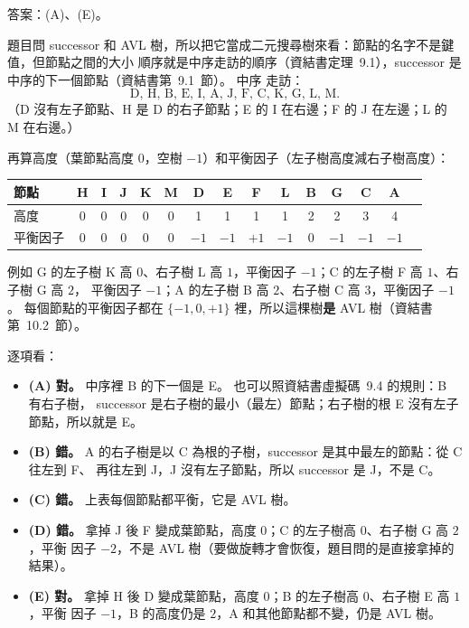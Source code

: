 \begin{pastsoln}
答案：(A)、(E)。

題目問 successor 和 AVL 樹，所以把它當成二元搜尋樹來看：節點的名字不是鍵值，但節點之間的大小
順序就是中序走訪的順序（資結書定理~9.1），successor 是中序的下一個節點（資結書第~9.1~節）。 中序
走訪：
\[
\text{D, H, B, E, I, A, J, F, C, K, G, L, M}.
\]
（D 沒有左子節點、H 是 D 的右子節點；E 的 I 在右邊；F 的 J 在左邊；L 的 M 在右邊。）

再算高度（葉節點高度 $0$，空樹 $-1$）和平衡因子（左子樹高度減右子樹高度）：
\begin{center}
\small
\begin{tabular}{lcccccccccccccc}
\toprule
節點 & H & I & J & K & M & D & E & F & L & B & G & C & A \\
\midrule
高度 & 0 & 0 & 0 & 0 & 0 & 1 & 1 & 1 & 1 & 2 & 2 & 3 & 4 \\
平衡因子 & 0 & 0 & 0 & 0 & 0 & $-1$ & $-1$ & $+1$ & $-1$ & 0 & $-1$ & $-1$ & $-1$ \\
\bottomrule
\end{tabular}
\end{center}
例如 G 的左子樹 K 高 $0$、右子樹 L 高 $1$，平衡因子 $-1$；C 的左子樹 F 高 $1$、右子樹 G 高 $2$，
平衡因子 $-1$；A 的左子樹 B 高 $2$、右子樹 C 高 $3$，平衡因子 $-1$。 每個節點的平衡因子都在
$\{-1, 0, +1\}$ 裡，所以這棵樹\textbf{是} AVL 樹（資結書第~10.2~節）。

逐項看：
\begin{itemize}
\item \textbf{(A) 對。} 中序裡 B 的下一個是 E。 也可以照資結書虛擬碼~9.4 的規則：B 有右子樹，
successor 是右子樹的最小（最左）節點；右子樹的根 E 沒有左子節點，所以就是 E。
\item \textbf{(B) 錯。} A 的右子樹是以 C 為根的子樹，successor 是其中最左的節點：從 C 往左到 F、
再往左到 J，J 沒有左子節點，所以 successor 是 J，不是 C。
\item \textbf{(C) 錯。} 上表每個節點都平衡，它是 AVL 樹。
\item \textbf{(D) 錯。} 拿掉 J 後 F 變成葉節點，高度 $0$；C 的左子樹高 $0$、右子樹 G 高 $2$，平衡
因子 $-2$，不是 AVL 樹（要做旋轉才會恢復，題目問的是直接拿掉的結果）。
\item \textbf{(E) 對。} 拿掉 H 後 D 變成葉節點，高度 $0$；B 的左子樹高 $0$、右子樹 E 高 $1$，平衡
因子 $-1$，B 的高度仍是 $2$，A 和其他節點都不變，仍是 AVL 樹。
\end{itemize}
\end{pastsoln}

